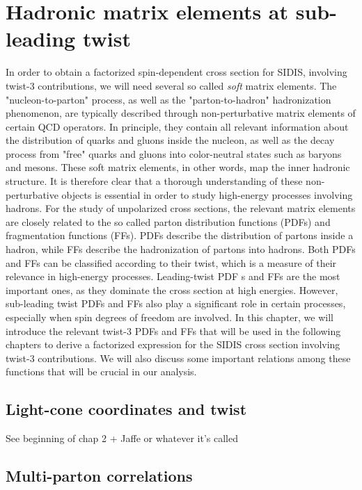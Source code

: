 \chapter{Hadronic matrix elements at sub-leading twist}
In order to obtain a factorized spin-dependent cross section for SIDIS, involving twist-3 contributions, we will need several so called \textit{soft} matrix elements. The "nucleon-to-parton" process, as well as the "parton-to-hadron" hadronization phenomenon, are typically described through non-perturbative matrix elements of certain QCD operators. In principle, they contain all relevant information about the distribution of quarks and gluons inside the nucleon, as well as the decay process from "free" quarks and gluons into color-neutral states such as baryons and mesons. These soft matrix elements, in other words, map the inner hadronic structure. It is therefore clear that a thorough understanding of these non-perturbative objects is essential in order to study high-energy processes involving hadrons.
For the study of unpolarized cross sections, the relevant matrix elements are closely related to the so called parton distribution functions (PDFs) and fragmentation functions (FFs). PDFs describe the distribution of partons inside a hadron, while FFs describe the hadronization of partons into hadrons. Both PDFs and FFs can be classified according to their twist, which is a measure of their relevance in high-energy processes. Leading-twist PDF s and FFs are the most important ones, as they dominate the cross section at high energies. However, sub-leading twist PDFs and FFs also play a significant role in certain processes, especially when spin degrees of freedom are involved. In this chapter, we will introduce the relevant twist-3 PDFs and FFs that will be used in the following chapters to derive a factorized expression for the SIDIS cross section involving twist-3 contributions. We will also discuss some important relations among these functions that will be crucial in our analysis.

\section{Light-cone coordinates and twist}
See beginning of chap 2 + Jaffe or whatever it's called

\section{Multi-parton correlations}


